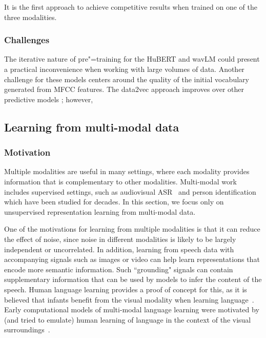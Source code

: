  It is the first approach to achieve competitive results when trained on  one of the three modalities. 

\subsubsection{Challenges}
The iterative nature of pre"=training for the HuBERT and wavLM could present a practical inconvenience when working with large volumes of data. Another challenge for these models centers around the quality of the initial vocabulary generated from MFCC features. 
The data2vec approach improves over other predictive models ; however, 

\subsection{Learning from multi-modal data}
\subsubsection{Motivation}
Multiple modalities are useful in many settings, where each modality provides information that is complementary to other modalities.  Multi-modal work includes supervised settings, such as audiovisual ASR~\parencite{petajan_automatic_1984,potamianos_recent_2003} and person identification~\parencite{aleksic_audiovisual_2006} which have been studied for decades.  In this section, we focus only on unsupervised representation learning from multi-modal data.

One of the motivations for learning from multiple modalities is that it can reduce the effect of noise, since noise in different modalities is likely to be largely independent or uncorrelated.  In addition, learning from speech data with accompanying signals such as images or video can help learn representations that encode more semantic information. Such ``grounding" signals can contain supplementary information that can be used by models to infer the content of the speech. Human language learning provides a proof of concept for this, as it is believed that infants benefit from the visual modality when learning language~\parencite{legerstee_infants_1990}. Early computational models of multi-modal language learning were motivated by (and tried to emulate) human learning of language in the context of the visual surroundings~\parencite{roy_learning_1999}.


